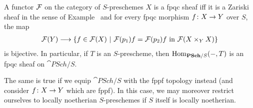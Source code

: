 \documentclass[a4paper,parskip=half,numbers=enddot, DIV=12]{scrreprt}
\begin{document}
\begin{prop}
	A functor $\mathcal{F}$ on the category of $S$-preschemes $X$ is a fpqc sheaf iff it is a Zariski sheaf in the sense of Example~ and for every fpqc morphism $f\colon X\morphism Y$ over $S$, the map
	\begin{align*}
		\Ff(Y)\morphism\left\{f\in\Ff(X)\st \Ff( p_1)f=\Ff( p_2)f\text{ in }\Ff(X\times_YX)\right\}
	\end{align*}
	is bijective. In particular, if $T$ is an $S$-prescheme, then $\Hom_{\cat{PSch}/S}(-,T)$ is an fpqc sheaf on $\cat{PSch}/S$.
	
	The same is true if we equip $\cat{PSch}/S$ with the fppf topology instead (and consider $f\colon X\morphism Y$ which are fppf). In this case, we may moreover restrict ourselves to locally noetherian $S$-preschemes if $S$ itself is locally noetherian.
\end{prop}
\end{document}
